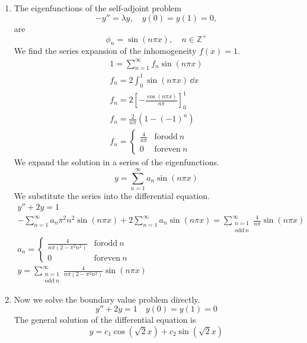 {\begin{Solution}
  \begin{enumerate}
  \item 
    The eigenfunctions of the self-adjoint problem
    \[
    -y'' = \lambda y, \quad y(0) = y(1) = 0,
    \]
    are 
    \[
    \phi_n = \sin(n \pi x), \quad n \in \mathbb{Z}^+
    \]
    We find the series expansion of the inhomogeneity $f(x) = 1$.
    \begin{gather*}
      1 = \sum_{n = 1}^\infty f_n \sin(n \pi x)
      \\
      f_n = 2 \int_0^1 \sin(n \pi x) \,\dd x 
      \\
      f_n = 2 \left[ - \frac{ \cos(n \pi x) }{ n \pi } \right]_0^1
      \\
      f_n = \frac{2}{n \pi} (1 - (-1)^n)
      \\
      f_n = \begin{cases}
        \frac{4}{n \pi} &\mathrm{for odd}\ n \\
        0 &\mathrm{for even}\ n
      \end{cases}
    \end{gather*}
    We expand the solution in a series of the eigenfunctions.
    \[
    y = \sum_{n = 1}^\infty a_n \sin(n \pi x)
    \]
    We substitute the series into the differential equation.
    \begin{gather*}
      y'' + 2 y = 1
      \\
      - \sum_{n = 1}^\infty a_n \pi^2 n^2 \sin(n \pi x) + 2 \sum_{n = 1}^\infty a_n \sin(n \pi x)
      = \sum_{\substack{n = 1 \\ \mathrm{odd}\ n}}^\infty \frac{4}{n \pi} \sin(n \pi x)
      \\
      a_n = \begin{cases}
        \frac{4}{n \pi (2 - \pi^2 n^2)} &\mathrm{for odd}\ n \\
        0 &\mathrm{for even}\ n
      \end{cases}
      \\
      \boxed{
        y = \sum_{\substack{n = 1 \\ \mathrm{odd}\ n}}^\infty \frac{4}{n \pi (2 - \pi^2 n^2)} \sin(n \pi x)
        }
    \end{gather*}
  \item 
    Now we solve the boundary value problem directly.  
    \[
    y'' + 2 y = 1 \quad y(0) = y(1) = 0
    \]
    The general solution of the differential equation is
    \[
    y = c_1 \cos \left( \sqrt{2} x \right) + c_2 \sin \left( \sqrt{2} x \right)
\]
\end{enumerate}
\end{Solution}}

